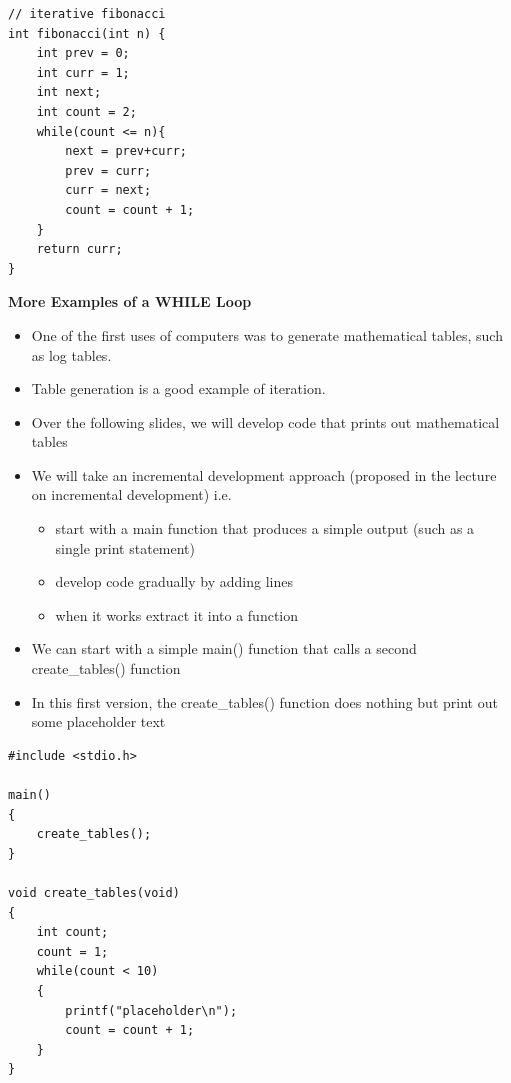 \documentclass{beamer}
\begin{document}
\begin{frame}[fragile]
\begin{block}{}
\begin{lstlisting}
// iterative fibonacci 
int fibonacci(int n) {
    int prev = 0;
    int curr = 1;
    int next;
    int count = 2;
    while(count <= n){
        next = prev+curr;
        prev = curr;
        curr = next;
        count = count + 1;
    }
    return curr;
}
\end{lstlisting}
\end{block}
\end{frame}

\begin{frame} 
\begin{center}
\textbf{More Examples of a WHILE Loop}
\end{center}
\begin{itemize}
\item One of the first uses of computers was to generate mathematical tables, such as log tables.
\item Table generation is a good example of iteration.
\item Over the following slides, we will develop code that prints out mathematical tables
\item We will take an incremental development approach (proposed in the lecture on incremental development) i.e.
\begin{itemize}
\item start with a main function that produces a simple output (such as a single print statement)
\item develop code gradually by adding lines
\item when it works extract it into a function
\end{itemize}
\end{itemize}
 \end{frame}

\begin{frame} 
\begin{itemize}
\item We can start with a simple main() function that calls a second create\_tables() function
\item In this first version, the create\_tables() function does nothing but print out some placeholder text
\end{itemize}
 \end{frame}
 
\begin{frame}[fragile]
\begin{block}{}
\begin{lstlisting}
#include <stdio.h>

main() 
{
    create_tables();
}

void create_tables(void)
{
    int count;
    count = 1;
    while(count < 10)
    {
        printf("placeholder\n");
        count = count + 1;
    }
}
\end{lstlisting}
\end{block}
\end{frame}
\end{document}

